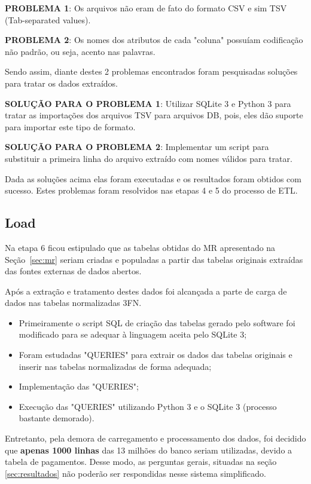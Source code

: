 \documentclass[12pt]{article}
\begin{document}
	\textbf{PROBLEMA 1}: Os arquivos não eram de fato do formato CSV e sim TSV (Tab-separated values). 
	
	\textbf{PROBLEMA 2}: Os nomes dos atributos de cada "coluna" possuíam codificação não padrão, ou seja, acento nas palavras. 
	
	Sendo assim, diante destes 2 problemas encontrados foram pesquisadas soluções para tratar os dados extraídos.
	
	\textbf{SOLUÇÃO PARA O PROBLEMA 1}: Utilizar SQLite 3 e Python 3 para tratar as importações dos arquivos TSV para arquivos DB, pois, eles dão suporte para importar este tipo de formato.
	
	\textbf{SOLUÇÃO PARA O PROBLEMA 2}: Implementar um script para substituir a primeira linha do arquivo extraído com nomes válidos para tratar.
	
	Dada as soluções acima elas foram executadas e os resultados foram obtidos com sucesso. Estes problemas foram resolvidos nas etapas 4 e 5 do processo de ETL. 
	
	\subsection{Load}
	\label{sec:l}
	
	Na etapa 6 ficou estipulado que as tabelas obtidas do MR apresentado na Seção~\ref{sec:mr} seriam criadas e populadas a partir das tabelas originais extraídas das fontes externas de dados abertos.
	
	Após a extração e tratamento destes dados foi alcançada a parte de carga de dados nas tabelas normalizadas 3FN. 
	
	\begin{itemize}
		\item Primeiramente o script SQL de criação das tabelas gerado pelo software \cite{mysql} foi modificado para se adequar à linguagem aceita pelo SQLite 3;
		\item Foram estudadas "QUERIES" para extrair os dados das tabelas originais e inserir nas tabelas normalizadas de forma adequada;
		\item Implementação das "QUERIES";
		\item Execução das "QUERIES" utilizando Python 3 e o SQLite 3 (processo bastante demorado).
	\end{itemize}
	
	Entretanto, pela demora de carregamento e processamento dos dados, foi decidido que \textbf{apenas 1000 linhas} das 13 milhões do banco seriam utilizadas, devido a tabela de pagamentos. Desse modo, as perguntas gerais, situadas na seção \ref{sec:resultados} não poderão ser respondidas nesse sistema simplificado.
	
\end{document}
